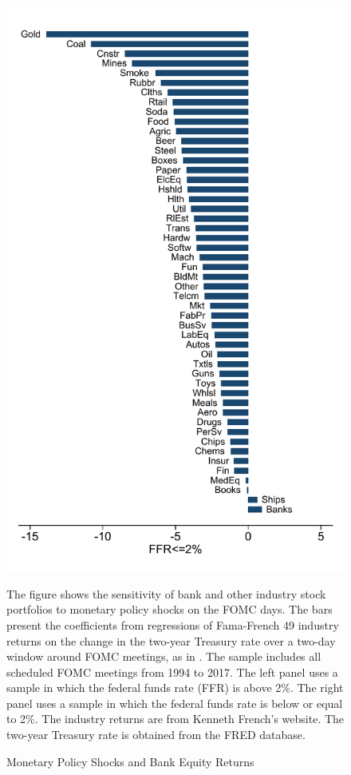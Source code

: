 \documentclass[12pt]{article}
\begin{document}
\begin{figure}[h]
\begin{centering}
		\includegraphics[scale=0.5]{../output/Figures/industry_fomc_bar_lt2}\caption{Monetary Policy Shocks and Bank Equity Returns\label{Fig: ind_stock_return}}
	\end{centering}
	{\footnotesize{The figure shows the sensitivity of bank and other industry stock portfolios to monetary policy shocks on the FOMC days. The bars present the coefficients from regressions of Fama-French 49 industry returns on the change in the two-year Treasury rate over a two-day window around FOMC meetings,  as in \cite{HansonStein2015}. The sample includes all scheduled FOMC meetings from 1994 to 2017. The left panel uses a sample in which the federal funds rate (FFR) is above 2\%. The right panel uses a sample in which the federal funds rate  is below or equal to 2\%. The industry returns are from Kenneth French's website. The two-year Treasury rate is obtained from the FRED database.}}
\end{figure}
\end{document}
